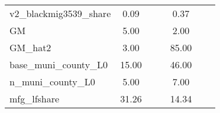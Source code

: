 \begin{table}[htbp]
\begin{tabular}{l*{2}{ccc}}
v2\_blackmig3539\_share&        0.09&            &            &        0.37&            &            \\
GM                  &        5.00&            &            &        2.00&            &            \\
GM\_hat2             &        3.00&            &            &       85.00&            &            \\
base\_muni\_county\_L0 &       15.00&            &            &       46.00&            &            \\
n\_muni\_county\_L0    &        5.00&            &            &        7.00&            &            \\
mfg\_lfshare         &       31.26&            &            &       14.34&            &            \\
\bottomrule
\end{tabular}
\end{table}
